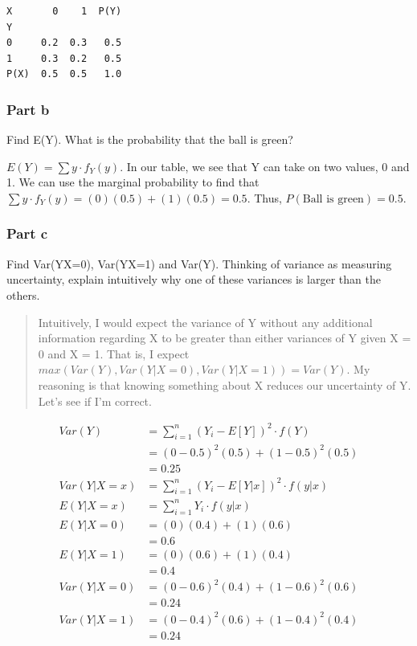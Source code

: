 \documentclass[
  letterpaper,
  DIV=11,
  numbers=noendperiod]{scrartcl}
\begin{document}
\begin{verbatim}
X       0    1  P(Y)
Y                   
0     0.2  0.3   0.5
1     0.3  0.2   0.5
P(X)  0.5  0.5   1.0
\end{verbatim}

\subsubsection{Part b}\label{part-b}

Find E(Y). What is the probability that the ball is green?

\(E(Y) = \sum y\cdot f_Y(y)\). In our table, we see that Y can take on
two values, 0 and 1. We can use the marginal probability to find that
\(\sum y\cdot f_Y(y) = (0)(0.5) + (1)(0.5) = 0.5\). Thus,
\(P(\text{Ball is green}) = 0.5\).

\subsubsection{Part c}\label{part-c}

Find Var(Y\textbar X=0), Var(Y\textbar X=1) and Var(Y). Thinking of
variance as measuring uncertainty, explain intuitively why one of these
variances is larger than the others.

\begin{quote}
Intuitively, I would expect the variance of Y without any additional
information regarding X to be greater than either variances of Y given X
= 0 and X = 1. That is, I expect
\(max(Var(Y), Var(Y|X=0), Var(Y|X=1)) = Var(Y)\). My reasoning is that
knowing something about X reduces our uncertainty of Y. Let's see if I'm
correct.
\end{quote}

\[
\begin{align*}
Var(Y) &= \sum_{i = 1}^n (Y_i - E[Y])^2\cdot f(Y)\\
&= (0 -0.5)^2(0.5) + (1-0.5)^2(0.5)\\
&= 0.25\\
Var(Y|X=x) &= \sum_{i =1}^n (Y_i - E[Y | x])^2\cdot f(y|x)\\
E(Y|X=x) &= \sum_{i = 1}^nY_i\cdot f(y|x)\\
E(Y|X=0) &= (0)(0.4) + (1)(0.6)\\
&= 0.6\\
E(Y|X=1) &= (0)(0.6) + (1)(0.4)\\
&= 0.4\\
Var(Y|X=0) &= (0 - 0.6)^2(0.4) + (1 - 0.6)^2(0.6)\\
&= 0.24\\
Var(Y|X=1) &= (0 - 0.4)^2(0.6) + (1 - 0.4)^2(0.4)\\
&= 0.24\\
\end{align*}
\]
\end{document}

